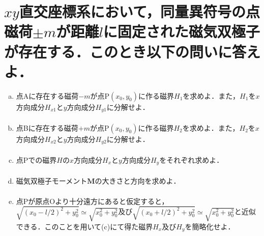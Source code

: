 \documentclass[dvipdfmx]{ujarticle}
\begin{document}
\section{$xy$直交座標系において，同量異符号の点磁荷$\pm m$が距離$l$に固定された磁気双極子が存在する．このとき以下の問いに答えよ．}
\begin{enumerate}[(a)]
	\item 点Aに存在する磁荷$-m$が点P$(x_0,y_0)$に作る磁界$H_{1}$を求めよ．また，$H_{1}$を$x$方向成分$H_{x1}$と$y$方向成分$H_{y1}$に分解せよ．
	\begin{align*}
	\end{align*}
	\item 点Bに存在する磁荷$+m$が点P$(x_0,y_0)$に作る磁界$H_{2}$を求めよ．また，$H_{2}$を$x$方向成分$H_{x2}$と$y$方向成分$H_{y2}$に分解せよ．
	\begin{align*}
	\end{align*}
	\item 点Pでの磁界$H$の$x$方向成分$H_{x}$と$y$方向成分$H_{y}$をそれぞれ求めよ．
	\begin{align*}
	\end{align*}
	\item 磁気双極子モーメント$\boldsymbol{M}$の大きさと方向を求めよ．
	\begin{align*}
	\end{align*}
	\item 点Pが原点Oより十分遠方にあると仮定すると，$\sqrt{(x_{0}-l/2)^{2}+y_{0}^{2}}\simeq \sqrt{x_{0}^{2}+y_{0}^{2}}$及び$\sqrt{(x_{0}+l/2)^{2}+y_{0}^{2}} \simeq \sqrt{x_{0}^{2}+y_{0}^{2}}$と近似できる．このことを用いて(c)にて得た磁界$H_{x}$及び$H_{y}$を簡略化せよ．

\end{enumerate}
\end{document}
